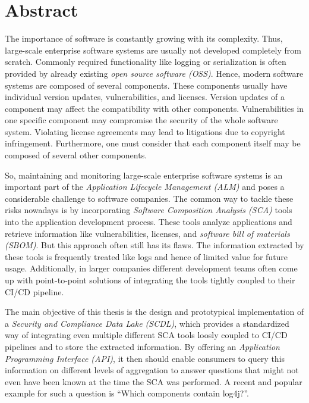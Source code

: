 
\titlespacing*{\chapter}{0pt}{0pt}{40pt}
\pagestyle{plain}
\chapter*{Abstract}
The importance of software is constantly growing with its complexity. Thus, large-scale enterprise software systems are usually not developed completely from scratch. Commonly required functionality like logging or serialization is often provided by already existing \textit{open source software (OSS)}. Hence, modern software systems are composed of several components. These components usually have individual version updates, vulnerabilities, and licenses. Version updates of a component may affect the compatibility with other components. Vulnerabilities in one specific component may compromise the security of the whole software system. Violating license agreements may lead to litigations due to copyright infringement. Furthermore, one must consider that each component itself may be composed of several other components.\par
So, maintaining and monitoring large-scale enterprise software systems is an important part of the \textit{Application Lifecycle Management (ALM)} and poses a considerable challenge to software companies. The common way to tackle these risks nowadays is by incorporating \textit{Software Composition Analysis (SCA)} tools into the application development process. These tools analyze applications and retrieve information like vulnerabilities, licenses, and \textit{software bill of materials (SBOM)}. But this approach often still has its flaws. The information extracted by these tools is frequently treated like logs and hence of limited value for future usage. Additionally, in larger companies different development teams often come up with point-to-point solutions of integrating the tools tightly coupled to their CI/CD pipeline.\par
The main objective of this thesis is the design and prototypical implementation of a \textit{Security and Compliance Data Lake (SCDL)}, which provides a standardized way of integrating even multiple different SCA tools loosly coupled to CI/CD pipelines and to store the extracted information. By offering an \textit{Application Programming Interface (API)}, it then should enable consumers to query this information on different levels of aggregation to answer questions that might not even have been known at the time the SCA was performed. A recent and popular example for such a question is \enquote{Which components contain log4j?}.\par
